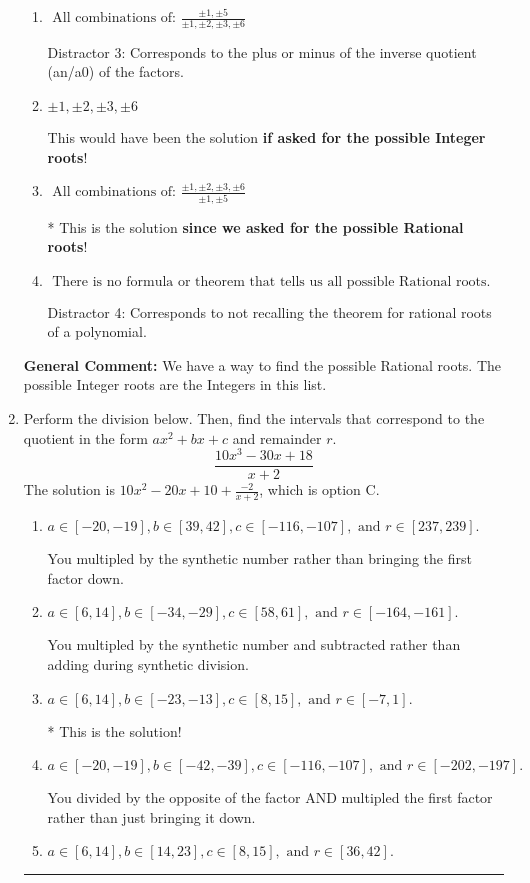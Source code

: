 \documentclass{extbook}[14pt]
\newcommand{\litem}[1]{\item #1

\rule{\textwidth}{0.4pt}}
\begin{document}
\begin{enumerate}
{\begin{enumerate}[label=\Alph*.]
 Distractor 1: Corresponds to the plus or minus factors of a1 only.
\item \( \text{ All combinations of: }\frac{\pm 1,\pm 5}{\pm 1,\pm 2,\pm 3,\pm 6} \)

 Distractor 3: Corresponds to the plus or minus of the inverse quotient (an/a0) of the factors. 
\item \( \pm 1,\pm 2,\pm 3,\pm 6 \)

This would have been the solution \textbf{if asked for the possible Integer roots}!
\item \( \text{ All combinations of: }\frac{\pm 1,\pm 2,\pm 3,\pm 6}{\pm 1,\pm 5} \)

* This is the solution \textbf{since we asked for the possible Rational roots}!
\item \( \text{ There is no formula or theorem that tells us all possible Rational roots.} \)

 Distractor 4: Corresponds to not recalling the theorem for rational roots of a polynomial.
\end{enumerate}

\textbf{General Comment:} We have a way to find the possible Rational roots. The possible Integer roots are the Integers in this list.
}
\litem{
Perform the division below. Then, find the intervals that correspond to the quotient in the form $ax^2+bx+c$ and remainder $r$.
\[ \frac{10x^{3} -30 x + 18}{x + 2} \]The solution is \( 10x^{2} -20 x + 10 + \frac{-2}{x + 2} \), which is option C.\begin{enumerate}[label=\Alph*.]
\item \( a \in [-20, -19], b \in [39, 42], c \in [-116, -107], \text{ and } r \in [237, 239]. \)

 You multipled by the synthetic number rather than bringing the first factor down.
\item \( a \in [6, 14], b \in [-34, -29], c \in [58, 61], \text{ and } r \in [-164, -161]. \)

 You multipled by the synthetic number and subtracted rather than adding during synthetic division.
\item \( a \in [6, 14], b \in [-23, -13], c \in [8, 15], \text{ and } r \in [-7, 1]. \)

* This is the solution!
\item \( a \in [-20, -19], b \in [-42, -39], c \in [-116, -107], \text{ and } r \in [-202, -197]. \)

 You divided by the opposite of the factor AND multipled the first factor rather than just bringing it down.
\item \( a \in [6, 14], b \in [14, 23], c \in [8, 15], \text{ and } r \in [36, 42]. \)


\end{enumerate}}
\end{enumerate}
\end{document}
